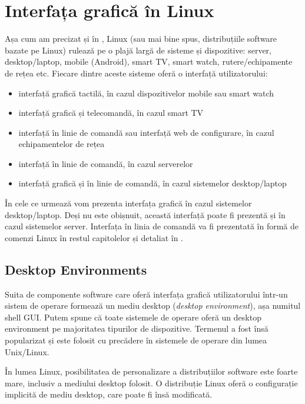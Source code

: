 \section{Interfața grafică în Linux}
\label{sec:ui:linux-gui}

Așa cum am precizat și în , Linux (sau mai bine spus, distribuțiile software bazate pe Linux) rulează pe o plajă largă de sisteme și dispozitive: server, desktop/laptop, mobile (Android), smart TV, smart watch, rutere/echipamente de rețea etc.
Fiecare dintre aceste sisteme oferă o interfață utilizatorului:

\begin{itemize}
  \item interfață grafică tactilă, în cazul dispozitivelor mobile sau smart watch
  \item interfață grafică și telecomandă, în cazul smart TV
  \item interfață în linie de comandă sau interfață web de configurare, în cazul echipamentelor de rețea
  \item interfață în linie de comandă, în cazul serverelor
  \item interfață grafică și în linie de comandă, în cazul sistemelor desktop/laptop
\end{itemize}

În cele ce urmează vom prezenta interfața grafică în cazul sistemelor desktop/laptop.
Deși nu este obișnuit, această interfață poate fi prezentă și în cazul sistemelor server.
Interfața în linia de comandă va fi prezentată în formă de comenzi Linux în restul capitolelor și detaliat în .

\subsection{Desktop Environments}
\label{sec:ui:desktop-environments}

Suita de componente software care oferă interfața grafică utilizatorului într-un sistem de operare formează un mediu desktop (\textit{desktop environment}), așa numitul shell GUI.
Putem spune că toate sistemele de operare oferă un desktop environment pe majoritatea tipurilor de dispozitive.
Termenul a fost însă popularizat și este folosit cu precădere în sistemele de operare din lumea Unix/Linux.

În lumea Linux, posibilitatea de personalizare a distribuțiilor software este foarte mare, inclusiv a mediului desktop folosit.
O distribuție Linux oferă o configurație implicită de mediu desktop, care poate fi însă modificată.

